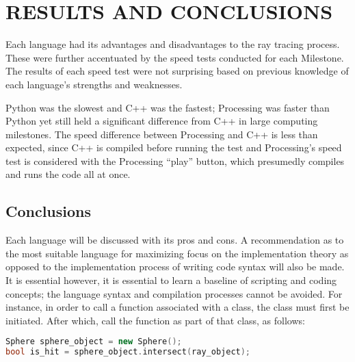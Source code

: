 %
%
%


\chapter{\uppercase{Results and Conclusions}}

Each language had its advantages and disadvantages to the ray tracing process.  These were further accentuated by the speed tests conducted for each Milestone.  The results of each speed test were not surprising based on previous knowledge of each language's strengths and weaknesses.  

Python was the slowest and C++ was the fastest; Processing was faster than Python yet still held a significant difference from C++ in large computing milestones.  The speed difference between Processing and C++ is less than expected, since C++ is compiled before running the test and Processing's speed test is considered with the Processing ``play'' button, which presumedly compiles and runs the code all at once.

\section{Conclusions}
Each language will be discussed with its pros and cons. A recommendation as to the most suitable language for maximizing focus on the implementation theory as opposed to the implementation process of writing code syntax will also be made. It is essential however, it is essential to learn a baseline of scripting and coding concepts; the language syntax and compilation processes cannot be avoided.  For instance, in order to call a function associated with a class, the class must first be initiated. After which, call the function as part of that class, as follows:

\singlespacing
\begin{lstlisting}[language=C++, caption=C++ Class usage example, style=mystyle, label=list:c++Use]
Sphere sphere_object = new Sphere();
bool is_hit = sphere_object.intersect(ray_object);
\end{lstlisting}
\doublespacing

